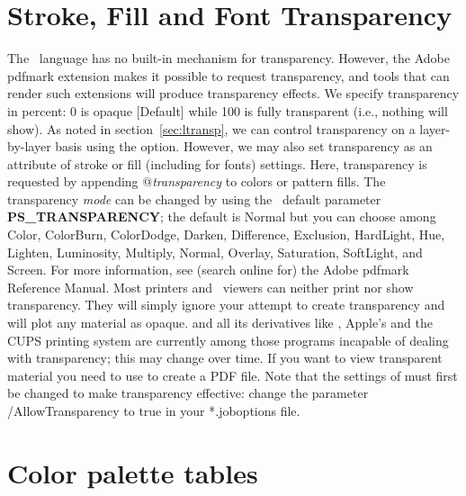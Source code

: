 \section{Stroke, Fill and Font Transparency}

%
%
%
%
%
%
\label{sec:transp}

The \PS\ language has no built-in mechanism for transparency.  However, the Adobe pdfmark
extension makes it possible to request transparency, and tools that can render such extensions
will produce transparency effects.  We specify transparency in percent: 0 is opaque [Default]
while 100 is fully transparent (i.e., nothing will show).  As noted in section~\ref{sec:ltransp}, we can control
transparency on a layer-by-layer basis using the  option.  However, we may also set
transparency as an attribute of stroke or fill (including for fonts) settings.  Here, transparency is requested by
appending @\emph{transparency} to colors or pattern fills.  The transparency \emph{mode} can be changed
by using the \GMT\ default parameter \textbf{PS\_TRANSPARENCY}; the default is Normal but you can choose among
Color, ColorBurn, ColorDodge, Darken, Difference, Exclusion, HardLight, Hue,
Lighten, Luminosity, Multiply, Normal, Overlay, Saturation, SoftLight, and Screen.
For more information, see (search online for) the Adobe pdfmark Reference Manual.
Most printers and \PS\ viewers can neither print nor show transparency. They will simply ignore your attempt to
create transparency and will plot any material as opaque.  and all its derivatives
like , Apple's  and the CUPS printing system are currently among
those programs incapable of dealing with transparency; this may change over time.
If you want to view transparent material you need to use  to create a
PDF file. Note that the settings of  must first be changed to make
transparency effective: change the parameter /AllowTransparency to true in your *.joboptions file.

\section{Color palette tables}


